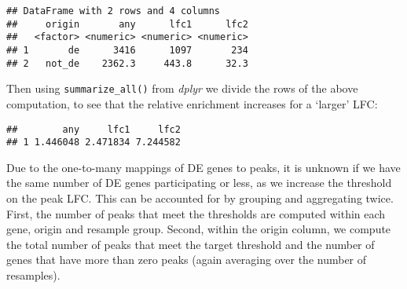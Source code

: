 \documentclass[
  9pt,
  a4paper,
]{extarticle}
\newenvironment{Shaded}{\begin{snugshade}}{\end{snugshade}}
\newcommand{\DataTypeTok}[1]{\textcolor[rgb]{0.13,0.29,0.53}{#1}}
\newcommand{\KeywordTok}[1]{\textcolor[rgb]{0.13,0.29,0.53}{\textbf{#1}}}
\newcommand{\NormalTok}[1]{#1}
\newcommand{\OperatorTok}[1]{\textcolor[rgb]{0.81,0.36,0.00}{\textbf{#1}}}
\newcommand{\StringTok}[1]{\textcolor[rgb]{0.31,0.60,0.02}{#1}}
\begin{document}
\begin{verbatim}
## DataFrame with 2 rows and 4 columns
##     origin       any      lfc1      lfc2
##   <factor> <numeric> <numeric> <numeric>
## 1       de      3416      1097       234
## 2   not_de    2362.3     443.8      32.3
\end{verbatim}

Then using \texttt{summarize\_all()} from \emph{dplyr} we divide the rows of the above
computation, to see that the relative enrichment increases for a `larger' LFC:

\begin{Shaded}
\end{Shaded}

\begin{verbatim}
##        any     lfc1     lfc2
## 1 1.446048 2.471834 7.244582
\end{verbatim}

Due to the one-to-many mappings of DE genes to peaks, it is unknown if we have
the same number of DE genes participating or less, as we increase the threshold
on the peak LFC. This can be accounted for by grouping and aggregating twice.
First, the number of peaks that meet the thresholds are computed within each
gene, origin and resample group. Second, within the origin column, we compute
the total number of peaks that meet the target threshold and the number of
genes that have more than zero peaks (again averaging over the number of
resamples).
\end{document}
